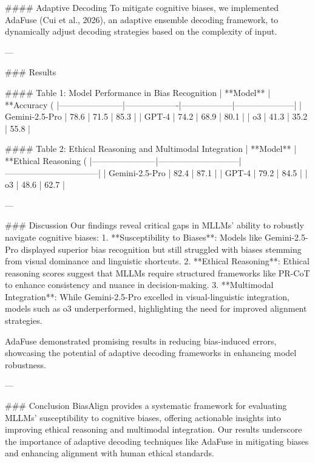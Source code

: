 #### Adaptive Decoding  
To mitigate cognitive biases, we implemented AdaFuse (Cui et al., 2026), an adaptive ensemble decoding framework, to dynamically adjust decoding strategies based on the complexity of input.

---

### Results  

#### Table 1: Model Performance in Bias Recognition  
| **Model**             | **Accuracy (%
|-----------------------|-------------------|------------------|---------------------|  
| Gemini-2.5-Pro        | 78.6             | 71.5             | 85.3               |  
| GPT-4                 | 74.2             | 68.9             | 80.1               |  
| o3                    | 41.3             | 35.2             | 55.8               |  

#### Table 2: Ethical Reasoning and Multimodal Integration  
| **Model**             | **Ethical Reasoning (%
|-----------------------|-----------------------------|---------------------------------|  
| Gemini-2.5-Pro        | 82.4                        | 87.1                           |  
| GPT-4                 | 79.2                        | 84.5                           |  
| o3                    | 48.6                        | 62.7                           |  

---

### Discussion  
Our findings reveal critical gaps in MLLMs' ability to robustly navigate cognitive biases:
1. **Susceptibility to Biases**: Models like Gemini-2.5-Pro displayed superior bias recognition but still struggled with biases stemming from visual dominance and linguistic shortcuts.
2. **Ethical Reasoning**: Ethical reasoning scores suggest that MLLMs require structured frameworks like PR-CoT to enhance consistency and nuance in decision-making.
3. **Multimodal Integration**: While Gemini-2.5-Pro excelled in visual-linguistic integration, models such as o3 underperformed, highlighting the need for improved alignment strategies.

AdaFuse demonstrated promising results in reducing bias-induced errors, showcasing the potential of adaptive decoding frameworks in enhancing model robustness.

---

### Conclusion  
BiasAlign provides a systematic framework for evaluating MLLMs' susceptibility to cognitive biases, offering actionable insights into improving ethical reasoning and multimodal integration. Our results underscore the importance of adaptive decoding techniques like AdaFuse in mitigating biases and enhancing alignment with human ethical standards.

